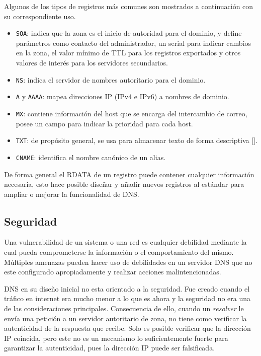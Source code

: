 Algunos de los tipos de registros más comunes son mostrados a continuación con su correspondiente uso.

\begin{itemize}
    \item \verb+SOA+: indica que la zona es el inicio de autoridad para el dominio, y define parámetros como contacto del administrador, un serial para indicar cambios en la zona, el valor mínimo de TTL para los registros exportados y otros valores de interés para los servidores secundarios.
    \item \verb+NS+: indica el servidor de nombres autoritario para el dominio.
    \item \verb+A+ y \verb+AAAA+: mapea direcciones IP (IPv4 e IPv6) a nombres de dominio.
    \item \verb+MX+: contiene información del host que se encarga del intercambio de correo, posee un campo para indicar la prioridad para cada host.\
    \item \verb+TXT+: de propósito general, se usa para almacenar texto de forma descriptiva [\cite{rfc_1464}].
    \item \verb+CNAME+: identifica el nombre canónico de un alias.
\end{itemize}

De forma general el RDATA de un registro puede contener cualquier información necesaria, esto hace posible diseñar y añadir nuevos registros al estándar para ampliar o mejorar la funcionalidad de DNS.

\subsection{Seguridad}

Una vulnerabilidad de un sistema o una red es cualquier debilidad mediante la cual pueda comprometerse la información o el comportamiento del mismo. Múltiples amenazas pueden hacer uso de debilidades en un servidor DNS que no este configurado apropiadamente y realizar acciones malintencionadas.

DNS en su diseño inicial no esta orientado a la seguridad. Fue creado cuando el tráfico en internet era mucho menor a lo que es ahora y la seguridad no era una de las consideraciones principales. Consecuencia de ello, cuando un \textit{resolver} le envía una petición a un servidor autoritario de zona, no tiene como verificar la autenticidad de la respuesta que recibe. Solo es posible verificar que la dirección IP coincida, pero este no es un mecanismo lo suficientemente fuerte para garantizar la autenticidad, pues la dirección IP puede ser falsificada.

